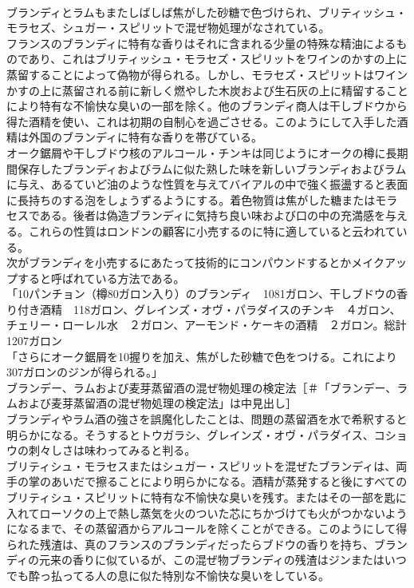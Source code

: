 \documentclass[8pt]{extreport}
\begin{document}
\begin{CJK}{UTF8}{min}
\\	ブランディとラムもまたしばしば焦がした砂糖で色づけられ、ブリティッシュ・モラセズ、シュガー・スピリットで混ぜ物処理がなされている。
\\	フランスのブランディに特有な香りはそれに含まれる少量の特殊な精油によるものであり、これはブリティッシュ・モラセズ・スピリットをワインのかすの上に蒸留することによって偽物が得られる。しかし、モラセズ・スピリットはワインかすの上に蒸留される前に新しく燃やした木炭および生石灰の上に精留することにより特有な不愉快な臭いの一部を除く。他のブランディ商人は干しブドウから得た酒精を使い、これは初期の自制心を過ごさせる。このようにして入手した酒精は外国のブランディに特有な香りを帯びている。
\\	オーク鋸屑や干しブドウ核のアルコール・チンキは同じようにオークの樽に長期間保存したブランディおよびラムに似た熟した味を新しいブランディおよびラムに与え、あるていど油のような性質を与えてバイアルの中で強く振盪すると表面に長持ちのする泡をしょうずるようにする。着色物質は焦がした糖またはモラセスである。後者は偽造ブランディに気持ち良い味および口の中の充満感を与える。これらの性質はロンドンの顧客に小売するのに特に適していると云われている。
\\	次がブランディを小売するにあたって技術的にコンパウンドするとかメイクアップすると呼ばれている方法である。
\\	「10パンチョン（樽80ガロン入り）のブランディ　1081ガロン、干しブドウの香り付き酒精　118ガロン、グレインズ・オヴ・パラダイスのチンキ　４ガロン、チェリー・ローレル水　２ガロン、アーモンド・ケーキの酒精　２ガロン。総計　1207ガロン
\\	「さらにオーク鋸屑を10握りを加え、焦がした砂糖で色をつける。これにより307ガロンのジンが得られる。」
\\	ブランデー、ラムおよび麦芽蒸留酒の混ぜ物処理の検定法［＃「ブランデー、ラムおよび麦芽蒸留酒の混ぜ物処理の検定法」は中見出し］
\\	ブランディやラム酒の強さを誤魔化したことは、問題の蒸留酒を水で希釈すると明らかになる。そうするとトウガラシ、グレインズ・オヴ・パラダイス、コショウの刺々しさは味わってみると判る。
\\	ブリティシュ・モラセスまたはシュガー・スピリットを混ぜたブランディは、両手の掌のあいだで擦ることにより明らかになる。酒精が蒸発すると後にすべてのブリティシュ・スピリットに特有な不愉快な臭いを残す。またはその一部を匙に入れてローソクの上で熱し蒸気を火のついた芯にちかづけても火がつかないようになるまで、その蒸留酒からアルコールを除くことができる。このようにして得られた残渣は、真のフランスのブランディだったらブドウの香りを持ち、ブランディの元来の香りに似ているが、この混ぜ物ブランディの残渣はジンまたはいつでも酔っ払ってる人の息に似た特別な不愉快な臭いをしている。

\end{CJK}
\end{document}
